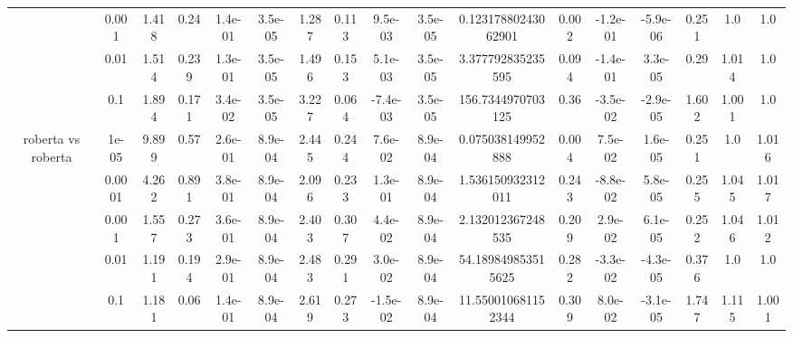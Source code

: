 \begin{tabular}{|c|c|c|c|c|c|c|c|c|c|c|c|c|c|c|c|c|}
 & 0.001 & 1.418 & 0.24 & 1.4e-01 & 3.5e-05 & 1.287 & 0.113 & 9.5e-03 & 3.5e-05 & 0.12317880243062901 & 0.002 & -1.2e-01 & -5.9e-06 & 0.251 & 1.0 & 1.0 \\
 & 0.01 & 1.514 & 0.239 & 1.3e-01 & 3.5e-05 & 1.496 & 0.153 & 5.1e-03 & 3.5e-05 & 3.377792835235595 & 0.094 & -1.4e-01 & 3.3e-05 & 0.29 & 1.014 & 1.0 \\
 & 0.1 & 1.894 & 0.171 & 3.4e-02 & 3.5e-05 & 3.227 & 0.064 & -7.4e-03 & 3.5e-05 & 156.7344970703125 & 0.36 & -3.5e-02 & -2.9e-05 & 1.602 & 1.001 & 1.0 \\
\hline
\multirow{5}{*}{roberta  vs roberta } & 1e-05 & 9.899 & 0.57 & 2.6e-01 & 8.9e-04 & 2.445 & 0.244 & 7.6e-02 & 8.9e-04 & 0.075038149952888 & 0.004 & 7.5e-02 & 1.6e-05 & 0.251 & 1.0 & 1.016 \\
 & 0.0001 & 4.262 & 0.891 & 3.8e-01 & 8.9e-04 & 2.096 & 0.233 & 1.3e-01 & 8.9e-04 & 1.536150932312011 & 0.243 & -8.8e-02 & 5.8e-05 & 0.255 & 1.045 & 1.017 \\
 & 0.001 & 1.557 & 0.273 & 3.6e-01 & 8.9e-04 & 2.403 & 0.307 & 4.4e-02 & 8.9e-04 & 2.132012367248535 & 0.209 & 2.9e-02 & 6.1e-05 & 0.252 & 1.046 & 1.012 \\
 & 0.01 & 1.191 & 0.194 & 2.9e-01 & 8.9e-04 & 2.483 & 0.291 & 3.0e-02 & 8.9e-04 & 54.189849853515625 & 0.282 & -3.3e-02 & -4.3e-05 & 0.376 & 1.0 & 1.0 \\
 & 0.1 & 1.181 & 0.06 & 1.4e-01 & 8.9e-04 & 2.619 & 0.273 & -1.5e-02 & 8.9e-04 & 11.550010681152344 & 0.309 & 8.0e-02 & -3.1e-05 & 1.747 & 1.115 & 1.001 \\
\hline
\end{tabular}